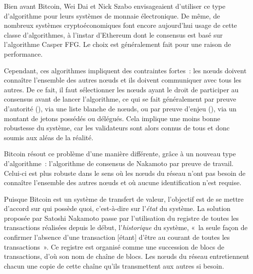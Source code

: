 Bien avant Bitcoin, Wei Dai et Nick Szabo envisageaient d'utiliser ce type d'algorithme pour leurs systèmes de monnaie électronique. De même, de nombreux systèmes cryptoéconomiques font encore aujourd'hui usage de cette classe d'algorithmes, à l'instar d'Ethereum dont le consensus est basé sur l'algorithme Casper FFG. Le choix est généralement fait pour une raison de performance.

Cependant, ces algorithmes impliquent des contraintes fortes~: les nœuds doivent connaître l'ensemble des autres nœuds et ils doivent communiquer avec tous les autres. De ce fait, il faut sélectionner les nœuds ayant le droit de participer au consensus avant de lancer l'algorithme, ce qui se fait généralement par preuve d'autorité (), via une liste blanche de nœuds, ou par preuve d'enjeu (), via un montant de jetons possédés ou délégués. Cela implique une moins bonne robustesse du système, car les validateurs sont alors connus de tous et donc soumis aux aléas de la réalité. 



Bitcoin résout ce problème d'une manière différente, grâce à un nouveau type d'algorithme~: l'algorithme de consensus de Nakamoto par preuve de travail. Celui-ci est plus robuste dans le sens où les nœuds du réseau n'ont pas besoin de connaître l'ensemble des autres nœuds et où aucune identification n'est requise.

Puisque Bitcoin est un système de transfert de valeur, l'objectif est de se mettre d'accord sur qui possède quoi, c'est-à-dire sur l'\emph{état} du système. La solution proposée par Satoshi Nakamoto passe par l'utilisation du registre de toutes les transactions réalisées depuis le début, l'\emph{historique} du système, «~la seule façon de confirmer l'absence d'une transaction [étant] d'être au courant de toutes les transactions~». Ce registre est organisé comme une succession de blocs de transactions, d'où son nom de chaîne de blocs. Les nœuds du réseau entretiennent chacun une copie de cette chaîne qu'ils transmettent aux autres si besoin.

